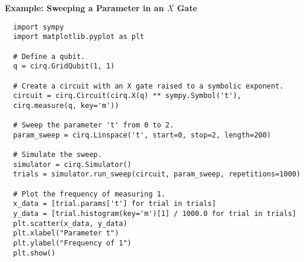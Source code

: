 \textbf{Example: Sweeping a Parameter in an \(X\) Gate}
\begin{verbatim}
  import sympy
  import matplotlib.pyplot as plt

  # Define a qubit.
  q = cirq.GridQubit(1, 1)

  # Create a circuit with an X gate raised to a symbolic exponent.
  circuit = cirq.Circuit(cirq.X(q) ** sympy.Symbol('t'),
  cirq.measure(q, key='m'))

  # Sweep the parameter 't' from 0 to 2.
  param_sweep = cirq.Linspace('t', start=0, stop=2, length=200)

  # Simulate the sweep.
  simulator = cirq.Simulator()
  trials = simulator.run_sweep(circuit, param_sweep, repetitions=1000)

  # Plot the frequency of measuring 1.
  x_data = [trial.params['t'] for trial in trials]
  y_data = [trial.histogram(key='m')[1] / 1000.0 for trial in trials]
  plt.scatter(x_data, y_data)
  plt.xlabel("Parameter t")
  plt.ylabel("Frequency of 1")
  plt.show()
\end{verbatim}

